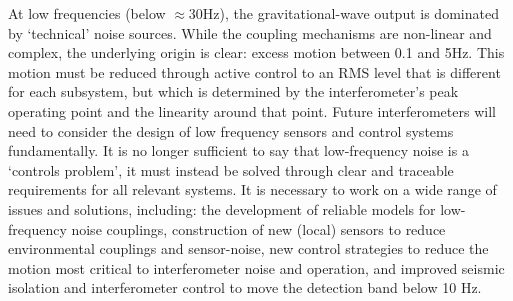 \par
{}
At low frequencies (below $\approx$30Hz), the gravitational-wave output is dominated by `technical' noise sources. While the coupling mechanisms are non-linear and complex, the underlying origin is clear: excess motion between 0.1 and 5Hz. This motion must be reduced through active control to an \ac{RMS} level that is different for each subsystem, but which is determined by the interferometer's peak operating point and the linearity around that point.
Future interferometers will need to consider the design of low frequency sensors and control systems fundamentally. It is no longer sufficient to say that low-frequency noise is a `controls problem', it must instead be solved through clear and traceable requirements for all relevant systems. 
It is necessary to work on a wide range of issues and solutions, including: the development of reliable models for low-frequency noise couplings, construction of new (local) sensors 
to reduce environmental couplings and sensor-noise, new control strategies to reduce the motion most critical to interferometer noise and operation, and improved seismic isolation and interferometer control to move the detection band below 10 Hz.


